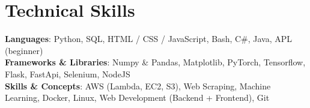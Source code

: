 \documentclass[letterpaper,11pt]{article}
\begin{document}
\section{Technical Skills}
 \begin{itemize}[leftmargin=0.15in, label={}]
    \small{\item{
     \textbf{Languages}{: Python, SQL, HTML / CSS / JavaScript, Bash, C\#, Java, APL (beginner)} \\
     \textbf{Frameworks \& Libraries}{: Numpy \& Pandas, Matplotlib, PyTorch, Tensorflow, Flask, FastApi, Selenium, NodeJS } \\
     \textbf{Skills \& Concepts}{: AWS (Lambda, EC2, S3), Web Scraping, Machine Learning, Docker, Linux, Web Development (Backend + Frontend), Git} \\
    }}
 \end{itemize}

\end{document}
